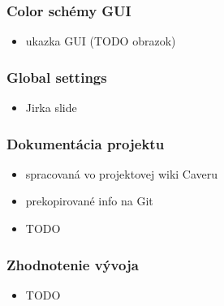 \documentclass[slovak]{beamer}
\begin{document}
\begin{frame}
\frametitle{Color schémy GUI}
	\begin{itemize}
		\item ukazka GUI (TODO obrazok)
	\end{itemize}
\end{frame}

\begin{frame}
\frametitle{Global settings}
	\begin{itemize}
		\item Jirka slide
	\end{itemize}
\end{frame}

\begin{frame}
\frametitle{Dokumentácia projektu}
	\begin{itemize}
		\item spracovaná vo projektovej wiki Caveru
		\item prekopirované info na Git
		\item TODO
	\end{itemize}
\end{frame}

\begin{frame}
\frametitle{Zhodnotenie vývoja}
	\begin{itemize}
		\item TODO
	\end{itemize}
\end{frame}
\end{document}
